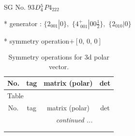 \documentclass[fleqn,8pt]{jsarticle}
\begin{document}
\setcounter{MaxMatrixCols}{32}

\renewcommand{\tablename}{Table~}
\renewcommand{\figurename}{Figure~}
\begin{center}
\LARGE
SG No. 93\quad$D_{\rm 4}^{5}$\quad$P4_222$\quad[ tetragonal ]
\end{center}

* generator : $\{2{}_{001}|0\},\,\,\{4^{+}_{\,\,001}|0 0 \frac{1}{2}\},\,\,\{2{}_{010}|0\}$

* symmetry operation\quad$+\left[ 0,\, 0,\, 0 \right]$
\renewcommand{\arraystretch}{1.3}
\begin{longtable}{cccc}
\caption{Symmetry operations for 3d polar vector.}
 \\
 \hline \hline
No. & tag & matrix (polar) & det \\ \hline \endfirsthead

\multicolumn{3}{l}{\tablename\ \thetable{}} \\
 \hline \hline
No. & tag & matrix (polar) & det \\ \hline \endhead

 \hline \hline
\multicolumn{3}{r}{\footnotesize\it continued ...} \\ \endfoot

 \hline \hline
\multicolumn{3}{r}{} \\ \endlastfoot


\end{longtable}
\end{document}
